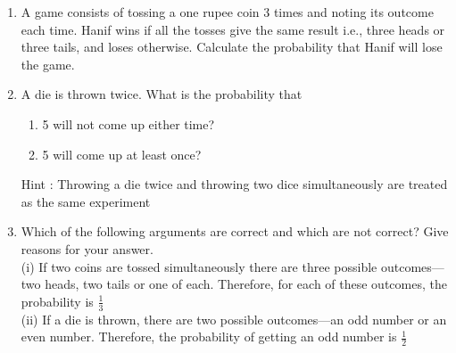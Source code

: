 \begin{enumerate}[label=\arabic*.,ref=\thesubsection.\theenumi]
\begin{enumerate}
\end{enumerate}
%
\begin{table}[ht!]
\centering

\caption{Input Values}
\label{table:1.2.133}	
\end{table}
\solution

\item A game consists of tossing a one rupee coin 3 times and noting its outcome each time. Hanif wins if all the tosses give the same result i.e., three heads or three tails, and loses otherwise. Calculate the probability that Hanif will lose the game.
\\
\solution

\item A die is thrown twice. What is the probability that\\
\begin{enumerate}[label=(\roman*)]
\item  5 will not come up either time? \\
\item  5 will come up at least once?\\
\end{enumerate}
Hint : Throwing a die twice and throwing two dice simultaneously are treated as the
same experiment
\\
\solution

\item Which of the following arguments are correct and which are not correct? Give reasons
for your answer.\\
(i) If two coins are tossed simultaneously there are three possible outcomes—two
heads, two tails or one of each. Therefore, for each of these outcomes, the
probability is $\frac{1}{3}$ \\
(ii) If a die is thrown, there are two possible outcomes—an odd number or an even
number. Therefore, the probability of getting an odd number is $\frac{1}{2}$\\\\

\end{enumerate}
